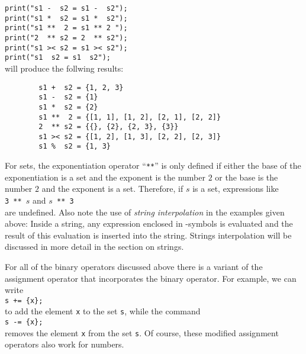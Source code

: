 \texttt{print("s1 - \ s2 = s1 - \ s2");}
\\
\hspace*{1.3cm}
\texttt{print("s1 * \ s2 = s1 * \ s2");}
\\
\hspace*{1.3cm}
\texttt{print("s1 ** \ 2  = s1 ** 2\ ");}
\\
\hspace*{1.3cm}
\texttt{print("2 \ ** s2  = 2 \ ** s2");}
\\
\hspace*{1.3cm}
\texttt{print("s1 >< s2 = s1 >< s2");}
\\
\hspace*{1.3cm}
\texttt{print("s1  \ s2 = s1  \ s2");}
\\[0.2cm]
will produce the follwing results:
\begin{verbatim}
        s1 +  s2 = {1, 2, 3}
        s1 -  s2 = {1}
        s1 *  s2 = {2}
        s1 **  2 = {[1, 1], [1, 2], [2, 1], [2, 2]}
        2  ** s2 = {{}, {2}, {2, 3}, {3}}
        s1 >< s2 = {[1, 2], [1, 3], [2, 2], [2, 3]}
        s1 %  s2 = {1, 3}
\end{verbatim}
For sets, the exponentiation operator ``\texttt{**}'' is only defined if either the base
of the exponentiation is a set and the exponent is the number $2$ or the base is the
number $2$ and the exponent is a set.  Therefore, if $s$ is a set, expressions like
\\[0.2cm]
\hspace*{1.3cm}
\texttt{3 ** $s$} \quad and \quad \texttt{$s$ ** 3}
\\[0.2cm]
are undefined. 
Also note the use of \emph{string interpolation} in the examples given
above:  Inside a string, any expression enclosed in
-symbols is evaluated and the result of this evaluation is
inserted into the string.
Strings interpolation will be discussed in more detail in the section on strings.

For all of the binary operators discussed above there is a variant of
the assignment operator that incorporates the binary operator.  For example, we can write
\\[0.2cm]
\hspace*{1.3cm}
\texttt{s += \{x\};}
\\[0.2cm]
to add the element \texttt{x} to the set \texttt{s}, while the command
\\[0.2cm]
\hspace*{1.3cm}
\texttt{s -= \{x\};}
\\[0.2cm]
removes the element \texttt{x} from the set \texttt{s}.  Of course,
these modified assignment operators also work for numbers.
\vspace*{0.2cm}

